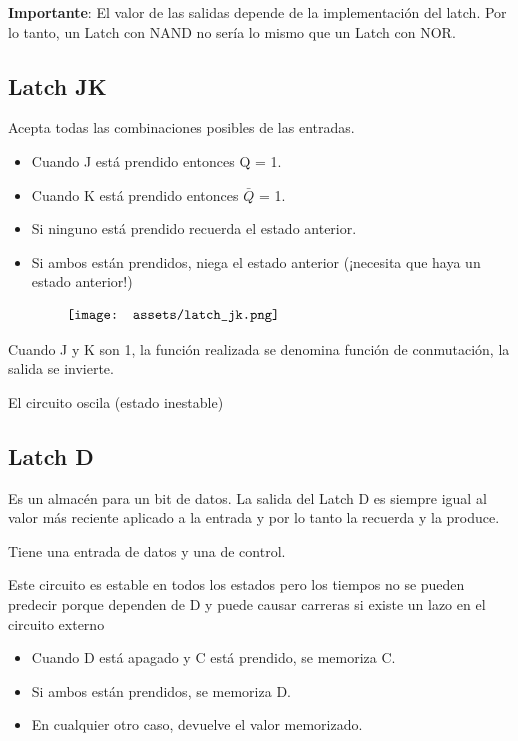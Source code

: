 \documentclass[10pt,a4paper]{article}
\begin{document}
\textbf{Importante}: El valor de las salidas depende de la implementación del latch. Por lo tanto, un Latch con NAND no sería lo mismo que un Latch con NOR.

\subsection*{Latch JK}
Acepta todas las combinaciones posibles de las entradas.
\begin{itemize}
    \item Cuando J está prendido entonces Q = 1.
    \item Cuando K está prendido entonces \(\bar{Q}\) = 1.
    \item Si ninguno está prendido recuerda el estado anterior. 
    \item Si ambos están prendidos, niega el estado anterior (¡necesita que haya un estado anterior!)
\end{itemize}

\[\begin{minipage}[b]{0.8\textwidth}
    \texttt{[image: assets/latch\_jk.png]}
    \label{fig:latch_jk}
\end{minipage}\]

Cuando J y K son 1, la función realizada se denomina función de conmutación, la salida se invierte. 

El circuito oscila (estado inestable)

\subsection*{Latch D}
Es un almacén para un bit de datos. La salida del Latch D es siempre igual al valor más reciente aplicado a la entrada y por lo tanto la recuerda y la produce.

Tiene una entrada de datos y una de control.

Este circuito es estable en todos los estados pero los tiempos no se pueden predecir porque dependen de D y puede causar carreras si existe un lazo en el circuito externo

\begin{itemize}
    \item Cuando D está apagado y C está prendido, se memoriza C.
    \item Si ambos están prendidos, se memoriza D.
    \item En cualquier otro caso, devuelve el valor memorizado.
\end{itemize}
\end{document}
